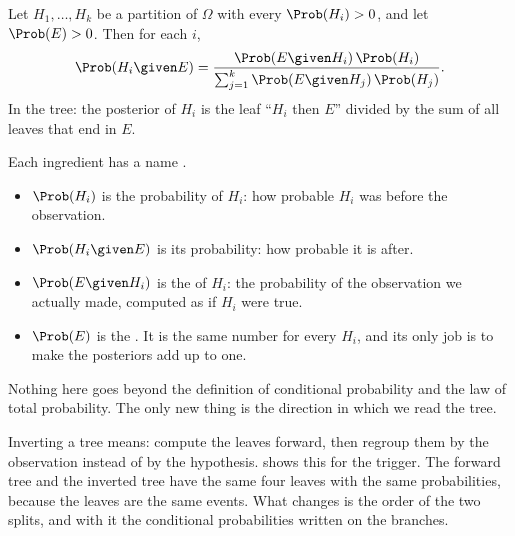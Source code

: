\begin{keyidea}
Let $H_1,\dots,H_k$ be a partition of $\Omega$ with every $\Prob(H_i)>0$, and let
$\Prob(E)>0$. Then for each $i$,
\begin{equation}
\Prob(H_i\given E)
=\frac{\Prob(E\given H_i)\,\Prob(H_i)}{\sum_{j=1}^k\Prob(E\given H_j)\,\Prob(H_j)} .
\label{1a:eq:bayes}
\end{equation}
In the tree: the posterior of $H_i$ is the leaf ``$H_i$ then $E$'' divided by
the sum of all leaves that end in $E$.
\end{keyidea}

Each ingredient has a name .
\begin{itemize}[leftmargin=1.5em,itemsep=1pt]
  \item $\Prob(H_i)$ is the  probability of $H_i$: how probable
        $H_i$ was before the observation.
  \item $\Prob(H_i\given E)$ is its  probability: how probable
        it is after.
  \item $\Prob(E\given H_i)$ is the  of $H_i$: the probability
        of the observation we actually made, computed as if $H_i$ were true.
  \item $\Prob(E)$ is the . It is the same number for every
        $H_i$, and its only job is to make the posteriors add up to one.
\end{itemize}
Nothing here goes beyond the definition of conditional probability and the law
of total probability. The only new thing is the direction in which we read the
tree.

Inverting a tree means: compute the leaves forward, then regroup them by the
observation instead of by the hypothesis.  shows this for the
trigger. The forward tree and the inverted tree have the same four leaves with
the same probabilities, because the leaves are the same events. What changes is
the order of the two splits, and with it the conditional probabilities written
on the branches.

